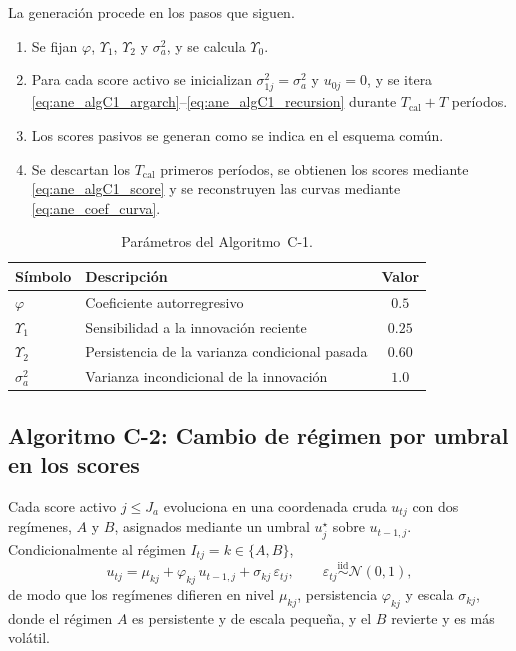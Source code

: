 La generación procede en los pasos que siguen.
\begin{enumerate}
    \item Se fijan $\varphi$, $\Upsilon_1$, $\Upsilon_2$ y $\sigma_a^{2}$, y se calcula $\Upsilon_0$.

    \item Para cada score activo se inicializan $\sigma_{1j}^{2}=\sigma_a^{2}$ y $u_{0j}=0$, y se itera \eqref{eq:ane_algC1_argarch}--\eqref{eq:ane_algC1_recursion} durante $T_{\mathrm{cal}}+T$ períodos.

    \item Los scores pasivos se generan como se indica en el esquema común.

    \item Se descartan los $T_{\mathrm{cal}}$ primeros períodos, se obtienen los scores mediante \eqref{eq:ane_algC1_score} y se reconstruyen las curvas mediante \eqref{eq:ane_coef_curva}.
\end{enumerate}

\begin{table}[H]
\centering
\caption{Parámetros del Algoritmo~C-1.}
\label{tab:ane_algC1}
\begin{tabular}{llc}
\hline
Símbolo & Descripción & Valor \\
\hline
$\varphi$       & Coeficiente autorregresivo                          & $0.5$ \\
$\Upsilon_1$    & Sensibilidad a la innovación reciente               & $0.25$ \\
$\Upsilon_2$    & Persistencia de la varianza condicional pasada      & $0.60$ \\
$\sigma_a^{2}$  & Varianza incondicional de la innovación             & $1.0$ \\
\hline
\end{tabular}
\end{table}

\subsection{Algoritmo C-2: Cambio de régimen por umbral en los scores}
\label{ane_00_02_02_alg_c2}
Cada score activo $j\le J_a$ evoluciona en una coordenada cruda $u_{tj}$ con dos regímenes, $A$ y $B$, asignados mediante un umbral $u_j^{\star}$ sobre $u_{t-1,j}$. Condicionalmente al régimen $I_{tj}=k\in\{A,B\}$,
\begin{equation}\label{eq:ane_algC2}
    u_{tj}=\mu_{kj}+\varphi_{kj}\,u_{t-1,j}+\sigma_{kj}\,\varepsilon_{tj},
    \qquad
    \varepsilon_{tj}\overset{\mathrm{iid}}{\sim}\mathcal{N}(0,1),
\end{equation}
de modo que los regímenes difieren en nivel $\mu_{kj}$, persistencia $\varphi_{kj}$ y escala $\sigma_{kj}$, donde el régimen $A$ es persistente y de escala pequeña, y el $B$ revierte y es más volátil.\\

